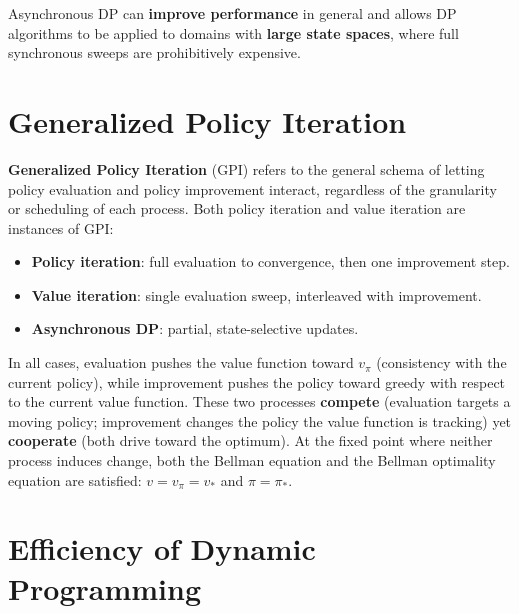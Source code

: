 \documentclass[11pt,a4paper]{article}
\theoremstyle{definition}
\theoremstyle{plain}
\theoremstyle{remark}
\begin{document}
Asynchronous DP can \textbf{improve performance} in general and allows DP algorithms to be applied to domains with \textbf{large state spaces}, where full synchronous sweeps are prohibitively expensive.

\section{Generalized Policy Iteration}

\begin{tcolorbox}[colback=blue!5!white, colframe=blue!60!black, title={Generalized Policy Iteration (GPI)}]
\textbf{Generalized Policy Iteration} (GPI) refers to the general schema of letting policy evaluation and policy improvement interact, regardless of the granularity or scheduling of each process. Both policy iteration and value iteration are instances of GPI:
\begin{itemize}
    \item \textbf{Policy iteration}: full evaluation to convergence, then one improvement step.
    \item \textbf{Value iteration}: single evaluation sweep, interleaved with improvement.
    \item \textbf{Asynchronous DP}: partial, state-selective updates.
\end{itemize}
In all cases, evaluation pushes the value function toward $v_\pi$ (consistency with the current policy), while improvement pushes the policy toward greedy with respect to the current value function. These two processes \textbf{compete} (evaluation targets a moving policy; improvement changes the policy the value function is tracking) yet \textbf{cooperate} (both drive toward the optimum). At the fixed point where neither process induces change, both the Bellman equation and the Bellman optimality equation are satisfied: $v = v_\pi = v_*$ and $\pi = \pi_*$.
\end{tcolorbox}

\section{Efficiency of Dynamic Programming}
\end{document}
